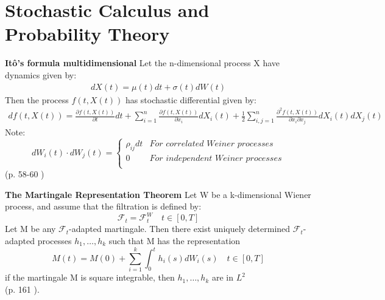 
\chapter{Stochastic Calculus and Probability Theory} %

\label{AppendixA} %

\begin{theorem}\label{Ito}
\textbf{Itô's formula multidimensional} Let the n-dimensional process X have dynamics given by:
\begin{align}
dX(t)=\mu(t)dt+\sigma(t)dW(t)
\end{align}
Then the process $f(t,X(t))$ has stochastic differential given by:
\begin{equation}
\begin{split}
df(t,X(t))=\frac{\partial f(t,X(t))}{\partial t}  dt + \sum_{i=1}^{n} \frac{\partial f(t,X(t))}{\partial x_i}  dX_i(t) + \frac{1}{2} \sum_{i,j=1}^{n} \frac{\partial^2 f(t,X(t))}{\partial x_i \partial x_j}  dX_i(t)dX_j(t)  
\end{split}
\end{equation}
Note: \[ dW_i(t) \cdot dW_j(t)= \begin{cases} 
      \rho_{ij}dt & \textit{For correlated Weiner processes} \\
      0 & \textit{For independent Weiner processes} \\
   \end{cases}
\]
\null \hfill (p. 58-60 \parencite{finKont})
\end{theorem}

\begin{theorem}\label{MRT}
\textbf{The Martingale Representation Theorem} 
Let W be a k-dimensional Wiener process, and assume that the filtration is defined by:
$$\mathcal{F}_t=\mathcal{F}_t^W \quad t\in [0,T]$$
Let M be any $\mathcal{F}_t$-adapted martingale. Then there exist uniquely determined $\mathcal{F}_t$-adapted processes $h_1, \ldots, h_k$ such that M has the representation
$$M(t)=M(0) + \sum_{i=1}^{k} \int_{0}^{t} h_i(s)dW_i(s) \quad t \in [0,T]$$
if the martingale M is square integrable, then $h_1, \ldots, h_k$ are in $L^2$\\
\null \hfill (p. 161 \parencite{finKont}).
\end{theorem}

